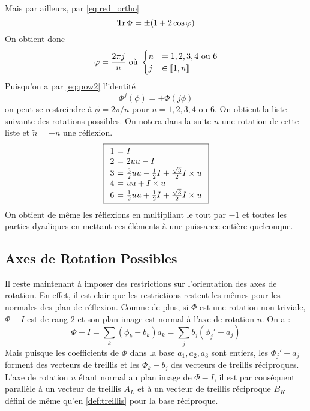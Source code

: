 \documentclass{cours}
\begin{document}
Mais par ailleurs, par \ref{eq:red_ortho}
\begin{equation}
    \operatorname{Tr} \Phi = \pm (1 + 2 \cos \varphi)
\end{equation}
On obtient donc
\begin{equation}
    \varphi = \frac{2 \pi j}{n} \text{ où } \begin{cases}
        n & = 1, 2, 3, 4 \text{ ou } 6 \\
        j & \in \left\llbracket 1, n\right\rrbracket
    \end{cases}
\end{equation}
Puisqu'on a par \ref{eq:pow2} l'identité \[\Phi^{j}(\phi) = \pm \Phi(j\phi)\] on peut se restreindre à $\phi = 2\pi/n$ pour $n = 1, 2, 3, 4 \text{ ou } 6$.
On obtient la liste suivante des rotations possibles. On notera dans la suite $n$ une rotation de cette liste et $\tilde{n} = - n$ une réflexion.
\begin{equation}\label{eq:rotations}
    \boxed{\begin{array}{r@{\ =\ }l}
            1 & I                                                           \\
            2 & 2uu - I                                                     \\
            3 & \frac{3}{2}uu - \frac{1}{2}I + \frac{\sqrt{3}}{2}I \times u \\
            4 & uu + I \times u                                             \\
            6 & \frac{1}{2}uu + \frac{1}{2}I + \frac{\sqrt{3}}{2}I\times u
        \end{array}}
\end{equation}
On obtient de même les réflexions en multipliant le tout par $-1$ et toutes les parties dyadiques en mettant ces éléments à une puissance entière quelconque.
\subsection{Axes de Rotation Possibles}
Il reste maintenant à imposer des restrictions sur l'orientation des axes de rotation. En effet, il est clair que les restrictions restent les mêmes pour les normales des plan de réflexion. Comme de plus, si $\Phi$ est une rotation non triviale, $\Phi - I$ est de rang $2$ et son plan image est normal à l'axe de rotation $u$. On a :
\begin{equation}
    \Phi - I = \sum_{k} \left(\phi_{k} - b_{k}\right)a_{k} = \sum_{j}b_{j}\left(\phi_{j}' - a_{j}\right)
\end{equation}
Mais puisque les coefficients de $\Phi$ dans la base $a_{1}, a_{2}, a_{3}$ sont entiers, les $\Phi_{j}' - a_{j}$ forment des vecteurs de treillis et les $\Phi_{k} - b_{j}$ des vecteurs de treillis réciproques. L'axe de rotation $u$ étant normal au plan image de $\Phi - I$, il est par conséquent parallèle à un vecteur de treillis $A_{L}$ et à un vecteur de treillis réciproque $B_{K}$ défini de même qu'en \ref{def:treillis} pour la base réciproque.
\end{document}
